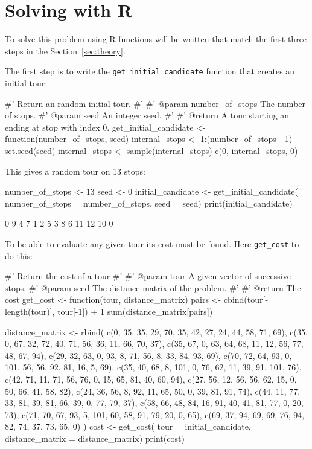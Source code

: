 \section{Solving with R}\label{sec:solving-with-R}

To solve this problem using R functions will be written that match the
first three steps in the Section~\ref{sec:theory}.

The first step is to write the \texttt{get_initial_candidate}
function that creates an initial tour:

\begin{Rin}
#' Return an random initial tour.
#'
#' @param number_of_stops The number of stops.
#' @param seed An integer seed.
#'
#' @return A tour starting an ending at stop with index 0.
get_initial_candidate <- function(number_of_stops, seed){
    internal_stops <- 1:(number_of_stops - 1)
    set.seed(seed)
    internal_stops <- sample(internal_stops)
    c(0, internal_stops, 0)
}
\end{Rin}

This gives a random tour on 13 stops:

\begin{Rin}
number_of_stops <- 13
seed <- 0
initial_candidate <- get_initial_candidate(
    number_of_stops = number_of_stops,
    seed = seed)
print(initial_candidate)
\end{Rin}

\begin{Rout}
 [1]  0  9  4  7  1  2  5  3  8  6 11 12 10  0
\end{Rout}

To be able to evaluate any given tour its cost must be found. Here
\texttt{get_cost} to do this:

\begin{Rin}
#' Return the cost of a tour
#'
#' @param tour A given vector of successive stops.
#' @param seed The distance matrix of the problem.
#'
#' @return The cost
get_cost <- function(tour, distance_matrix){
    pairs <-  cbind(tour[-length(tour)], tour[-1]) + 1
    sum(distance_matrix[pairs])
}
\end{Rin}

\begin{Rin}
distance_matrix <- rbind(
        c(0, 35, 35, 29, 70, 35, 42, 27, 24, 44, 58, 71, 69),
        c(35, 0, 67, 32, 72, 40, 71, 56, 36, 11, 66, 70, 37),
        c(35, 67, 0, 63, 64, 68, 11, 12, 56, 77, 48, 67, 94),
        c(29, 32, 63, 0, 93, 8, 71, 56, 8, 33, 84, 93, 69),
        c(70, 72, 64, 93, 0, 101, 56, 56, 92, 81, 16, 5, 69),
        c(35, 40, 68, 8, 101, 0, 76, 62, 11, 39, 91, 101, 76),
        c(42, 71, 11, 71, 56, 76, 0, 15, 65, 81, 40, 60, 94),
        c(27, 56, 12, 56, 56, 62, 15, 0, 50, 66, 41, 58, 82),
        c(24, 36, 56, 8, 92, 11, 65, 50, 0, 39, 81, 91, 74),
        c(44, 11, 77, 33, 81, 39, 81, 66, 39, 0, 77, 79, 37),
        c(58, 66, 48, 84, 16, 91, 40, 41, 81, 77, 0, 20, 73),
        c(71, 70, 67, 93, 5, 101, 60, 58, 91, 79, 20, 0, 65),
        c(69, 37, 94, 69, 69, 76, 94, 82, 74, 37, 73, 65, 0)
)
cost <- get_cost(
    tour = initial_candidate,
    distance_matrix = distance_matrix)
print(cost)
\end{Rin}

